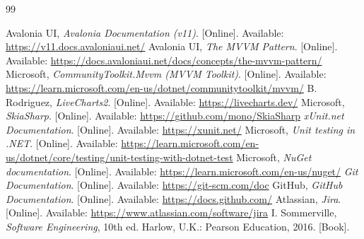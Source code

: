 \renewcommand{\bibname}{References}
\begin{thebibliography}{99}


 Avalonia UI, \emph{Avalonia Documentation (v11)}. [Online]. Available: \url{https://v11.docs.avaloniaui.net/}
 Avalonia UI, \emph{The MVVM Pattern}. [Online]. Available: \url{https://docs.avaloniaui.net/docs/concepts/the-mvvm-pattern/}
 Microsoft, \emph{CommunityToolkit.Mvvm (MVVM Toolkit)}. [Online]. Available: \url{https://learn.microsoft.com/en-us/dotnet/communitytoolkit/mvvm/}
 B. Rodriguez, \emph{LiveCharts2}. [Online]. Available: \url{https://livecharts.dev/}
 Microsoft, \emph{SkiaSharp}. [Online]. Available: \url{https://github.com/mono/SkiaSharp}
 \emph{xUnit.net Documentation}. [Online]. Available: \url{https://xunit.net/}
 Microsoft, \emph{Unit testing in .NET}. [Online]. Available: \url{https://learn.microsoft.com/en-us/dotnet/core/testing/unit-testing-with-dotnet-test}
 Microsoft, \emph{NuGet documentation}. [Online]. Available: \url{https://learn.microsoft.com/en-us/nuget/}
 \emph{Git Documentation}. [Online]. Available: \url{https://git-scm.com/doc}
 GitHub, \emph{GitHub Documentation}. [Online]. Available: \url{https://docs.github.com/}
 Atlassian, \emph{Jira}. [Online]. Available: \url{https://www.atlassian.com/software/jira}
 I. Sommerville, \emph{Software Engineering}, 10th ed. Harlow, U.K.: Pearson Education, 2016. [Book].

\end{thebibliography}
